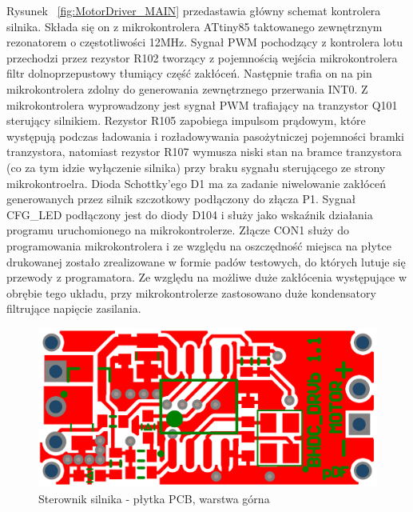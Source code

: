 Rysunek ~\ref{fig:MotorDriver_MAIN} przedastawia główny schemat kontrolera silnika. Składa się on z mikrokontrolera ATtiny85 taktowanego zewnętrznym rezonatorem o częstotliwości 12MHz. Sygnał PWM pochodzący z kontrolera lotu przechodzi przez rezystor R102 tworzący z pojemnością wejścia mikrokontrolera filtr dolnoprzepustowy tłumiący część zakłóceń. Następnie trafia on na pin mikrokontrolera zdolny do generowania zewnętrznego przerwania INT0. Z mikrokontrolera wyprowadzony jest sygnał PWM  trafiający na tranzystor Q101 sterujący silnikiem. Rezystor R105 zapobiega impulsom prądowym, które występują podczas ładowania i rozładowywania pasożytniczej pojemności bramki tranzystora, natomiast rezystor R107 wymusza niski stan na bramce tranzystora (co za tym idzie wyłączenie silnika) przy braku sygnału sterującego ze strony mikrokontroelra. Dioda Schottky'ego D1 ma za zadanie niwelowanie zakłóceń generowanych przez silnik szczotkowy podłączony do złącza P1. Sygnał CFG\_LED podłączony jest do diody D104 i służy jako wskaźnik działania programu uruchomionego na mikrokontrolerze. Złącze CON1 służy do programowania mikrokontrolera i ze względu na oszczędność miejsca na płytce drukowanej zostało zrealizowane w formie padów testowych, do których lutuje się przewody z programatora. Ze względu na możliwe duże zakłócenia występujące w obrębie tego układu, przy mikrokontrolerze zastosowano duże kondensatory filtrujące napięcie zasilania.

\begin{figure}[H]
	\centering
	\includegraphics[scale=0.4]{Pictures/MotorDriverPCB_Top.png}
		\caption[Sterownik silnika - płytka PCB, warstrwa górna]{Sterownik silnika - płytka PCB, warstwa górna}
	\label{fig:MotorDriverPCB_Top}
\end{figure}


